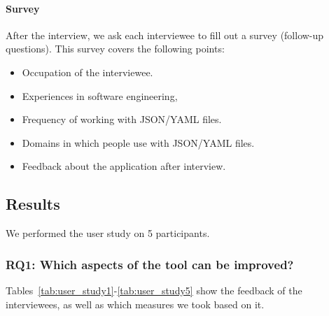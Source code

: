 \paragraph{Survey}
After the interview, we ask each interviewee to fill out a survey (follow-up questions).
This survey covers the following points:
\begin{itemize}
    \item Occupation of the interviewee.
    \item Experiences in software engineering,
    \item Frequency of working with JSON/YAML files.
    \item Domains in which people use with JSON/YAML files.
    \item Feedback about the application after interview.
\end{itemize}

\subsection{Results}\label{subsec:results}
We performed the user study on 5 participants.


\subsubsection{\textbf{RQ1:} Which aspects of the tool can be improved?} %
Tables~\ref{tab:user_study1}-\ref{tab:user_study5} show the feedback of the interviewees, as well as which measures we took based on it.


